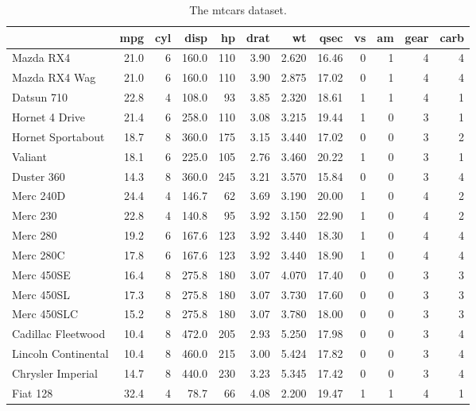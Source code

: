 \documentclass[
]{article}
\begin{document}
\begin{table}

\caption{\label{tab:ch-1-table}The mtcars dataset.}
\centering
\begin{tabular}[t]{l|r|r|r|r|r|r|r|r|r|r|r}
\hline
  & mpg & cyl & disp & hp & drat & wt & qsec & vs & am & gear & carb\\
\hline
Mazda RX4 & 21.0 & 6 & 160.0 & 110 & 3.90 & 2.620 & 16.46 & 0 & 1 & 4 & 4\\
\hline
Mazda RX4 Wag & 21.0 & 6 & 160.0 & 110 & 3.90 & 2.875 & 17.02 & 0 & 1 & 4 & 4\\
\hline
Datsun 710 & 22.8 & 4 & 108.0 & 93 & 3.85 & 2.320 & 18.61 & 1 & 1 & 4 & 1\\
\hline
Hornet 4 Drive & 21.4 & 6 & 258.0 & 110 & 3.08 & 3.215 & 19.44 & 1 & 0 & 3 & 1\\
\hline
Hornet Sportabout & 18.7 & 8 & 360.0 & 175 & 3.15 & 3.440 & 17.02 & 0 & 0 & 3 & 2\\
\hline
Valiant & 18.1 & 6 & 225.0 & 105 & 2.76 & 3.460 & 20.22 & 1 & 0 & 3 & 1\\
\hline
Duster 360 & 14.3 & 8 & 360.0 & 245 & 3.21 & 3.570 & 15.84 & 0 & 0 & 3 & 4\\
\hline
Merc 240D & 24.4 & 4 & 146.7 & 62 & 3.69 & 3.190 & 20.00 & 1 & 0 & 4 & 2\\
\hline
Merc 230 & 22.8 & 4 & 140.8 & 95 & 3.92 & 3.150 & 22.90 & 1 & 0 & 4 & 2\\
\hline
Merc 280 & 19.2 & 6 & 167.6 & 123 & 3.92 & 3.440 & 18.30 & 1 & 0 & 4 & 4\\
\hline
Merc 280C & 17.8 & 6 & 167.6 & 123 & 3.92 & 3.440 & 18.90 & 1 & 0 & 4 & 4\\
\hline
Merc 450SE & 16.4 & 8 & 275.8 & 180 & 3.07 & 4.070 & 17.40 & 0 & 0 & 3 & 3\\
\hline
Merc 450SL & 17.3 & 8 & 275.8 & 180 & 3.07 & 3.730 & 17.60 & 0 & 0 & 3 & 3\\
\hline
Merc 450SLC & 15.2 & 8 & 275.8 & 180 & 3.07 & 3.780 & 18.00 & 0 & 0 & 3 & 3\\
\hline
Cadillac Fleetwood & 10.4 & 8 & 472.0 & 205 & 2.93 & 5.250 & 17.98 & 0 & 0 & 3 & 4\\
\hline
Lincoln Continental & 10.4 & 8 & 460.0 & 215 & 3.00 & 5.424 & 17.82 & 0 & 0 & 3 & 4\\
\hline
Chrysler Imperial & 14.7 & 8 & 440.0 & 230 & 3.23 & 5.345 & 17.42 & 0 & 0 & 3 & 4\\
\hline
Fiat 128 & 32.4 & 4 & 78.7 & 66 & 4.08 & 2.200 & 19.47 & 1 & 1 & 4 & 1\\

\end{tabular}
\end{table}
\end{document}
